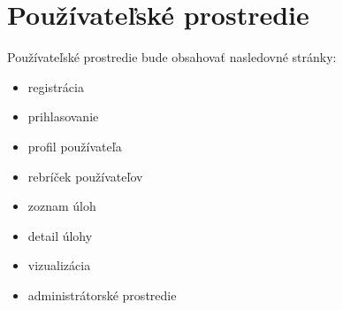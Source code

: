 \section{Používateľské prostredie}
Používateľské prostredie bude obsahovať nasledovné stránky:
\begin{itemize}
  \item registrácia
  \item prihlasovanie
  \item profil používateľa
  \item rebríček používateľov
  \item zoznam úloh
  \item detail úlohy
  \item vizualizácia
  \item administrátorské prostredie
\end{itemize}
